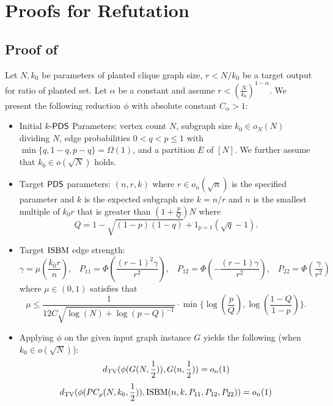 \documentclass[final,12pt]{colt2023} %
\newcommand\1[1]{\mathbb{I}_{\left\{#1\right\}}}
\begin{document}
\section{Proofs for Refutation}
\subsection{Proof of }
\begin{theorem}\label{PDSB}
Let $N, k_0$ be parameters of planted clique graph size, $r<N/k_0$ be a target output for ratio of planted set. Let $\alpha$ be a constant and assume $r<\left(\frac{N}{k_0}\right)^{1-\alpha}$. We present the following reduction $\phi$ with absolute constant $C_{\alpha}>1$:
\begin{itemize}
    \item \textup{Initial $k$-$\mathsf{PDS}$ Parameters:} vertex count $N$, subgraph size $k_0\in o_N(N)$ dividing $N$, edge probabilities $0 < q < p \leq 1$ with $\min\{q, 1 - q, p-q\} = \Omega(1)$, and a partition $E$ of $[N]$. We further assume that $k_0\in o(\sqrt{N})$ holds.

    \item \textup{Target $\mathsf{PDS}$ parameters:} $(n, r, k)$ where $r\in o_n(\sqrt{n})$ is the specified parameter and $k$ is the expected subgraph size $k=n/r$ and $n$ is the smallest multiple of $k_0r$ that is greater than $(1+\frac{p}{Q})N$ where $$Q=1-\sqrt{(1-p)(1-q)}+1_{p=1}(\sqrt{q}-1).$$
    
    \item \textup{Target $\textup{ISBM}$ edge strength:}
    $$\gamma=\mu(\frac{k_0r}{n}),\;\;\;P_{11}=\Phi(\frac{(r-1)^2\gamma}{r^2}) ,\;\;\; P_{12}=\Phi(-\frac{(r-1)\gamma}{r^2}),\;\;\;P_{22}=\Phi(\frac{\gamma}{r^2})$$
    where $\mu\in(0, 1)$ satisfies that$$\mu\leq\frac{1}{12C\sqrt{\log(N)+\log(p-Q)^{-1}}}\cdot\min\{\log(\frac{p}{Q}), \log(\frac{1-Q}{1-p})\}.$$
    \item Applying $\phi$ on the given input graph instance $G$  yields the following (when $k_0\in o(\sqrt{N})$):
$$d_{\rm TV}(\phi(G(N,\frac{1}{2})), G(n, \frac{1}{2}))=o_n(1)$$
$$d_{\rm TV}(\phi(PC_{\rho}(N, k_0, \frac{1}{2})), \textup{ISBM}(n, k, P_{11}, P_{12}, 
P_{22}))=o_n(1)$$
\end{itemize}
\end{theorem}
\end{document}

